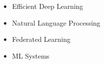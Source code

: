 
\begin{cvparagraph}

    \begin{itemize}
        \item Efficient Deep Learning
        \item Natural Language Processing
        \item Federated Learning
        \item ML Systems
    \end{itemize}
\end{cvparagraph}
